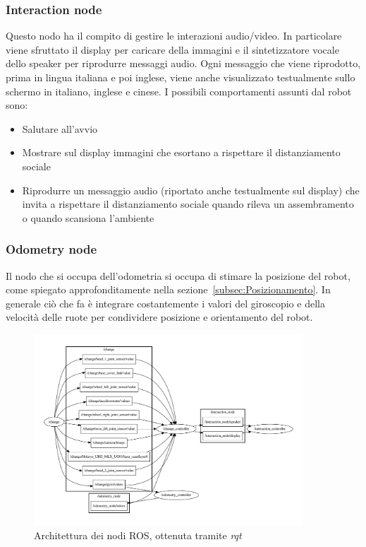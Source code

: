 \documentclass[a4paper]{article}
\begin{document}
	\subsubsection{Interaction node}\label{subsubsec:Interaction-node}
	Questo nodo ha il compito di gestire le interazioni audio/video. In
	particolare viene sfruttato il display per caricare della immagini e il
	sintetizzatore vocale dello speaker per riprodurre messaggi audio. Ogni
	messaggio che viene riprodotto, prima in lingua italiana e poi inglese,
	viene anche visualizzato testualmente sullo schermo in italiano, inglese e
	cinese.  I possibili comportamenti assunti dal robot sono:
	\begin{itemize}
		\item Salutare all'avvio
		\item Mostrare sul display immagini che esortano a rispettare il
			distanziamento sociale
		\item Riprodurre un messaggio audio (riportato anche testualmente sul
			display) che invita a rispettare il distanziamento sociale quando
			rileva un assembramento o quando scansiona l'ambiente
	\end{itemize}

	\subsubsection{Odometry node}\label{subsubsec:Odometry-node}
	Il nodo che si occupa dell'odometria si occupa di stimare la posizione del
	robot, come spiegato approfonditamente nella
	sezione~\ref{subsec:Posizionamento}. In generale ciò che fa è integrare
	costantemente i valori del giroscopio e della velocità delle ruote per
	condividere posizione e orientamento del robot.
	 

	\begin{figure}[H]
		\centering
		\includegraphics[width=0.9\textwidth]{img/rosgraph.pdf}
		\caption{Architettura dei nodi ROS, ottenuta tramite \textit{rqt}}
		\label{fig:rosgraph}
	\end{figure}
	
\end{document}
